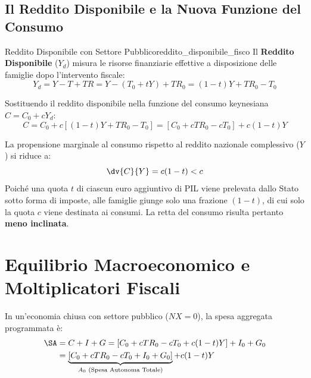 \subsection{Il Reddito Disponibile e la Nuova Funzione del Consumo}

\begin{definizione}{Reddito Disponibile con Settore Pubblico}{reddito_disponibile_fisco}
Il \textbf{Reddito Disponibile} ($Y_d$) misura le risorse finanziarie effettive a disposizione delle famiglie dopo l'intervento fiscale:
\begin{equation}
    Y_d = Y - T + TR = Y - (T_0 + t Y) + TR_0 = (1 - t)Y + TR_0 - T_0
\end{equation}
\end{definizione}

Sostituendo il reddito disponibile nella funzione del consumo keynesiana $C = C_0 + c Y_d$:
\begin{equation}
    C = C_0 + c \left[ (1 - t)Y + TR_0 - T_0 \right] = \left[ C_0 + c TR_0 - c T_0 \right] + c(1 - t)Y
\end{equation}

\begin{osservazione}
La propensione marginale al consumo rispetto al reddito nazionale complessivo ($Y$) si riduce a:
\begin{equation}
    \dv{C}{Y} = c(1 - t) < c
\end{equation}
Poiché una quota $t$ di ciascun euro aggiuntivo di PIL viene prelevata dallo Stato sotto forma di imposte, alle famiglie giunge solo una frazione $(1 - t)$, di cui solo la quota $c$ viene destinata ai consumi. La retta del consumo risulta pertanto \textbf{meno inclinata}.
\end{osservazione}

\section{Equilibrio Macroeconomico e Moltiplicatori Fiscali}

In un'economia chiusa con settore pubblico ($NX = 0$), la spesa aggregata programmata è:
\begin{align}
    \SA &= C + I + G = \left[ C_0 + c TR_0 - c T_0 + c(1 - t)Y \right] + I_0 + G_0 \notag \\
        &= \underbrace{\left[ C_0 + c TR_0 - c T_0 + I_0 + G_0 \right]}_{A_0 \text{ (Spesa Autonoma Totale)}} + c(1 - t)Y
\end{align}

